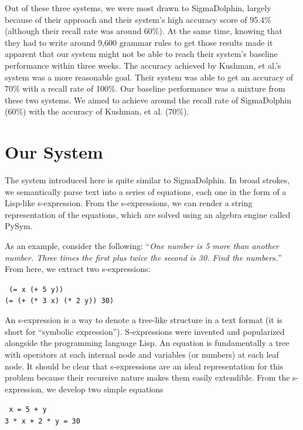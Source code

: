 \documentclass[11pt]{article}
\begin{document}
Out of these three systems, we were most drawn to SigmaDolphin, largely because of their approach and their system’s high accuracy score of 95.4\% (although their recall rate was around 60\%). At the same time, knowing that they had to write around 9,600 grammar rules to get those results made it apparent that our system might not be able to reach their system’s baseline performance within three weeks. The accuracy achieved by Kushman, et al.’s system was a more reasonable goal. Their system was able to get an accuracy of 70\% with a recall rate of 100\%. Our baseline performance was a mixture from these two systems. We aimed to achieve around the recall rate of SigmaDolphin (60\%) with the accuracy of Kushman, et al. (70\%).

\section{Our System}
The system introduced here is quite similar to SigmaDolphin. In broad strokes, we semantically parse text into a series of equations, each one in the form of a Lisp-like s-expression. From the s-expressions, we can render a string representation of the equations, which are solved using an algebra engine called PySym.

As an example, consider the following: ``\textit{One number is 5 more than another number. Three times the first plus twice the second is 30. Find the numbers.}'' From here, we extract two s-expressions:

\begin{center}
    \texttt{
(= x (+ 5 y))\\
(= (+ (* 3 x) (* 2 y)) 30)
    }
\end{center}

An s-expression is a way to denote a tree-like structure in a text format (it is short for ``symbolic expression''). S-expressions were invented and popularized alongside the programming language Lisp. An equation is fundamentally a tree with operators at each internal node and variables (or numbers) at each leaf node. It should be clear that s-expressions are an ideal representation for this problem because their recursive nature makes them easily extendible. From the s-expression, we develop two simple equations

\begin{center}
    \texttt{
x = 5 + y\\
3 * x + 2 * y = 30
    }
\end{center}
\end{document}
